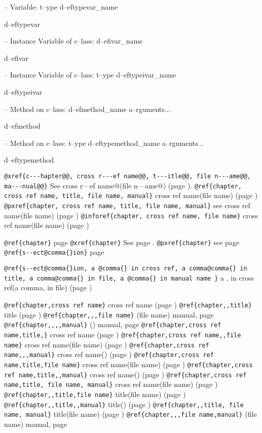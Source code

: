 \documentclass{book}
\begin{document}
\begin{titlepage}
\hbox{}-- Variable: t--ype d--eftypevar\_name


d--eftypevar

\hbox{}-- Instance Variable of c--lass: d--efivar\_name


d--efivar

\hbox{}-- Instance Variable of c--lass: t--ype d--eftypeivar\_name


d--eftypeivar

\hbox{}-- Method on c--lass: d--efmethod\_name a--rguments...


d--efmethod

\hbox{}-- Method on c--lass: t--ype d--eftypemethod\_name a--rguments...


d--eftypemethod

\texttt{@xref\{c{-}{-}{-}hapter@@, cross r{-}{-}{-}ef name@@, t{-}{-}{-}itle@@, file n{-}{-}{-}ame@@, ma{-}{-}{-}nual@@\}} See cross r---ef name@(file n---ame@) (page \pageref{anchor:c_002d_002d_002dhapter_0040}).
\texttt{@ref\{chapter, cross ref name, title, file name, manual\}} cross ref name(file name) (page \pageref{anchor:chapter})
\texttt{@pxref\{chapter, cross ref name, title, file name, manual\}} see cross ref name(file name) (page \pageref{anchor:chapter})
\texttt{@inforef\{chapter, cross ref name, file name\}} cross ref name(file name) (page \pageref{anchor:chapter})

\texttt{@ref\{chapter\}} page \pageref{anchor:chapter}
\texttt{@xref\{chapter\}} See page \pageref{anchor:chapter}.
\texttt{@pxref\{chapter\}} see page \pageref{anchor:chapter}
\texttt{@ref\{s{-}{-}ect@comma\{\}ion\}} page \pageref{anchor:s_002d_002dect_002cion}

\texttt{@ref\{s{-}{-}ect@comma\{\}ion, a @comma\{\} in cross
ref, a comma@comma\{\} in title, a comma@comma\{\} in file, a @comma\{\} in manual name \}}
a , in cross
ref(a comma, in file) (page \pageref{anchor:s_002d_002dect_002cion})

\texttt{@ref\{chapter,cross ref name\}} cross ref name (page \pageref{anchor:chapter})
\texttt{@ref\{chapter,,title\}} title (page \pageref{anchor:chapter})
\texttt{@ref\{chapter,,,file name\}} (file name) manual, page \pageref{anchor:chapter}
\texttt{@ref\{chapter,,,,manual\}} () manual, page \pageref{anchor:chapter}
\texttt{@ref\{chapter,cross ref name,title,\}} cross ref name (page \pageref{anchor:chapter})
\texttt{@ref\{chapter,cross ref name,,file name\}} cross ref name(file name) (page \pageref{anchor:chapter})
\texttt{@ref\{chapter,cross ref name,,,manual\}} cross ref name() (page \pageref{anchor:chapter})
\texttt{@ref\{chapter,cross ref name,title,file name\}} cross ref name(file name) (page \pageref{anchor:chapter})
\texttt{@ref\{chapter,cross ref name,title,,manual\}} cross ref name() (page \pageref{anchor:chapter})
\texttt{@ref\{chapter,cross ref name,title, file name, manual\}} cross ref name(file name) (page \pageref{anchor:chapter})
\texttt{@ref\{chapter,,title,file name\}} title(file name) (page \pageref{anchor:chapter})
\texttt{@ref\{chapter,,title,,manual\}} title() (page \pageref{anchor:chapter})
\texttt{@ref\{chapter,,title, file name, manual\}} title(file name) (page \pageref{anchor:chapter})
\texttt{@ref\{chapter,,,file name,manual\}} (file name) manual, page \pageref{anchor:chapter}



\end{titlepage}
\end{document}
